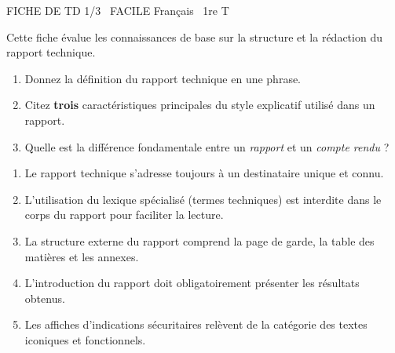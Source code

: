 \documentclass[11pt]{article}
\begin{document}
\pagestyle{empty}

\begin{tcolorbox}[enhanced,colback=popink,colframe=popink,arc=10pt,boxrule=0pt,left=12pt,right=12pt,top=9pt,bottom=9pt]
{\color{white}\popxbold\small FICHE DE TD 1/3 \textbullet\ FACILE \hfill Français \textbullet\ 1re T\par}
\end{tcolorbox}
\vspace{4pt}

\noindent Cette fiche évalue les connaissances de base sur la structure et la rédaction du rapport technique.

\begin{exercice}
\begin{enumerate}
    \item Donnez la définition du rapport technique en une phrase.
    \item Citez \textbf{trois} caractéristiques principales du style explicatif utilisé dans un rapport.
    \item Quelle est la différence fondamentale entre un \textit{rapport} et un \textit{compte rendu} ?
\end{enumerate}
\end{exercice}

\begin{exercice}
\begin{enumerate}
    \item Le rapport technique s'adresse toujours à un destinataire unique et connu.
    \item L'utilisation du lexique spécialisé (termes techniques) est interdite dans le corps du rapport pour faciliter la lecture.
    \item La structure externe du rapport comprend la page de garde, la table des matières et les annexes.
    \item L'introduction du rapport doit obligatoirement présenter les résultats obtenus.
    \item Les affiches d'indications sécuritaires relèvent de la catégorie des textes iconiques et fonctionnels.
\end{enumerate}
\end{exercice}
\end{document}
